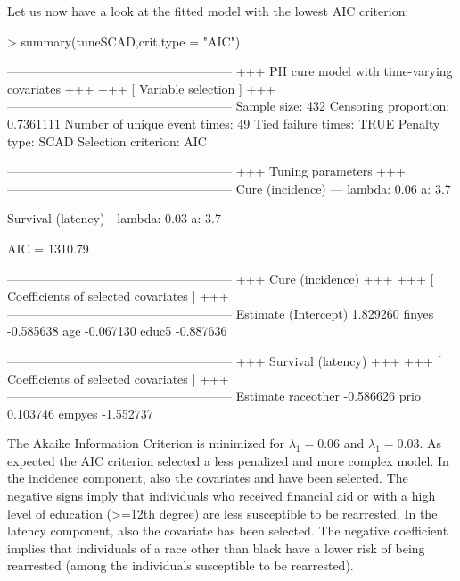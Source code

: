 Let us now have a look at the fitted model with the lowest AIC criterion: 

\begin{example}
> summary(tuneSCAD,crit.type = "AIC")

------------------------------------------------------
+++   PH cure model with time-varying covariates   +++
+++             [ Variable selection ]             +++
------------------------------------------------------
Sample size:  432
Censoring proportion:  0.7361111
Number of unique event times: 49
Tied failure times:  TRUE
Penalty type:  SCAD
Selection criterion:  AIC

------------------------------------------------------
+++               Tuning parameters                +++
------------------------------------------------------
 Cure (incidence) --- lambda:  0.06 
                           a:  3.7 

 Survival (latency) - lambda:  0.03 
                           a:  3.7 

 AIC =  1310.79 

------------------------------------------------------
+++                Cure (incidence)                +++
+++     [ Coefficients of selected covariates ]    +++
------------------------------------------------------
             Estimate
(Intercept)  1.829260
finyes      -0.585638
age         -0.067130
educ5       -0.887636

------------------------------------------------------
+++              Survival (latency)                +++
+++     [ Coefficients of selected covariates ]    +++
------------------------------------------------------
           Estimate
raceother -0.586626
prio       0.103746
empyes    -1.552737
\end{example}

The Akaike Information Criterion is minimized for $\lambda_1=0.06$ and $\lambda_1=0.03$.
As expected the AIC criterion selected a less penalized and more complex model.
In the incidence component, also the covariates  and  have been selected. 
The negative signs imply that individuals who received financial aid or with a high level of education (>=12th degree) are less susceptible to be rearrested.
In the latency component, also the covariate  has been selected.
The negative coefficient implies that individuals of a race other than black have a lower risk of being rearrested (among the individuals susceptible to be rearrested).



